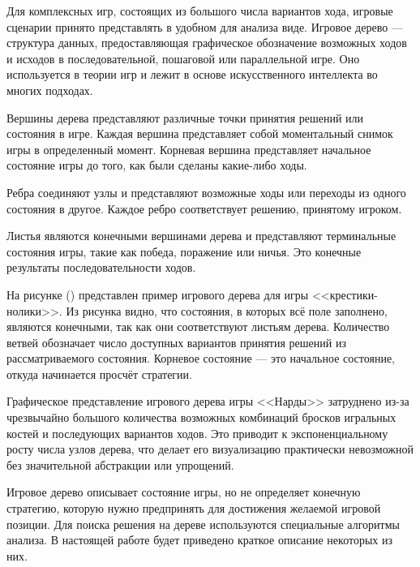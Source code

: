 Для комплексных игр, состоящих из большого числа вариантов хода, игровые сценарии принято представлять в удобном для анализа виде. Игровое дерево --- структура данных, предоставляющая графическое обозначение возможных ходов и исходов в последовательной, пошаговой или параллельной игре. Оно используется в теории игр и лежит в основе искусственного интеллекта во многих подходах.

Вершины дерева представляют различные точки принятия решений или состояния в игре. Каждая вершина представляет собой моментальный снимок игры в определенный момент. Корневая вершина представляет начальное состояние игры до того, как были сделаны какие-либо ходы.

Ребра соединяют узлы и представляют возможные ходы или переходы из одного состояния в другое. Каждое ребро соответствует решению, принятому игроком.

Листья являются конечными вершинами дерева и представляют терминальные состояния игры, такие как победа, поражение или ничья. Это конечные результаты последовательности ходов.

На рисунке () представлен пример игрового дерева для игры <<крестики-нолики>>. Из рисунка видно, что состояния, в которых всё поле заполнено, являются конечными, так как они соответствуют листьям дерева. Количество ветвей обозначает число доступных вариантов принятия решений из рассматриваемого состояния. Корневое состояние --- это начальное состояние, откуда начинается просчёт стратегии.


\pagebreak

Графическое представление игрового дерева игры <<Нарды>> затруднено из-за чрезвычайно большого количества возможных комбинаций бросков игральных костей и последующих вариантов ходов. Это приводит к экспоненциальному росту числа узлов дерева, что делает его визуализацию практически невозможной без значительной абстракции или упрощений.

Игровое дерево описывает состояние игры, но не определяет конечную стратегию, которую нужно предпринять для достижения желаемой игровой позиции. Для поиска решения на дереве используются специальные алгоритмы анализа. В настоящей работе будет приведено краткое описание некоторых из них.
